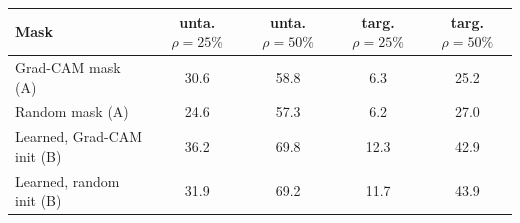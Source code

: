 \begin{tabular}{lcccc}
\toprule
Mask & unta. $\rho=25\%$ & unta. $\rho=50\%$ & targ. $\rho=25\%$ & targ. $\rho=50\%$ \\
\midrule
Grad-CAM mask (A) & 30.6 & 58.8 & 6.3 & 25.2 \\
Random mask (A) & 24.6 & 57.3 & 6.2 & 27.0 \\
Learned, Grad-CAM init (B) & 36.2 & 69.8 & 12.3 & 42.9 \\
Learned, random init (B) & 31.9 & 69.2 & 11.7 & 43.9 \\
\bottomrule
\end{tabular}
